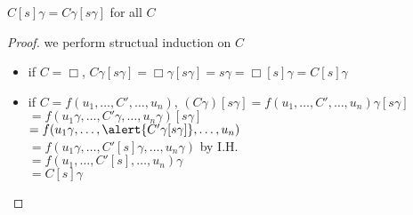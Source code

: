 \documentclass[12pt,aspectratio=169]{beamer}
\begin{document}
\begin{frame}
    \begin{lemma}
        $C[s]\gamma = C\gamma[s\gamma]$ for all $C$
    \end{lemma}
    \pause
    \begin{proof}
        we perform structual induction on $C$\\ \pause
        \begin{itemize} \pause
            \item if $C = \Box$, \pause
                $C\gamma[s\gamma] = \Box\gamma[s\gamma] = s\gamma = \Box[s]\gamma = C[s]\gamma$
            \pause
            \item if $C = f(u_1,\ldots,C',\ldots,u_n)$, \pause
                $(C\gamma)[s\gamma] = f(u_1,\ldots,C',\ldots,u_n)\gamma[s\gamma]$\\
                \quad\pause
                $= f(u_1\gamma,\ldots,C'\gamma,\ldots,u_n\gamma)[s\gamma]$ \\
                \quad\pause
                $= f(u_1\gamma, \ldots, \alert{C'\gamma[s\gamma]},\ldots,u_n)$\\
                \quad\pause
                $= f(u_1\gamma, \ldots, C'[s]\gamma,\ldots,u_n\gamma)$ by I.H. \\
                \quad\pause
                $= f(u_1, \ldots, C'[s], \ldots, u_n)\gamma$\\
                \quad\pause
                $= C[s]\gamma$
        \end{itemize}
    \end{proof}
\end{frame}
\end{document}
